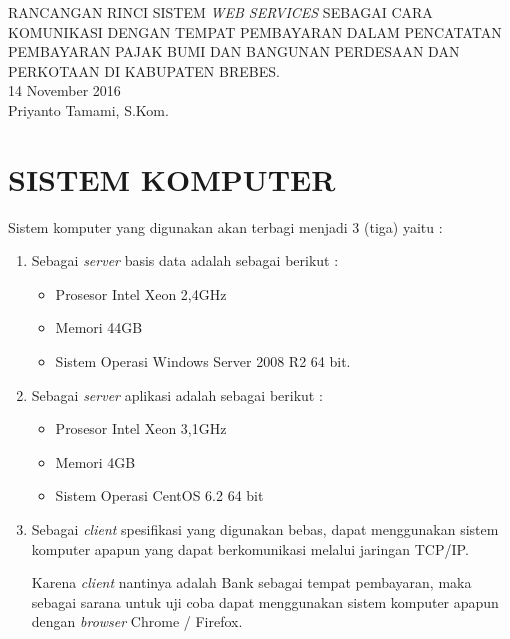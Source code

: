 \documentclass[pdftex,12pt, oneside]{article}
\begin{document}
\sloppy %

\begin{center}
{\large RANCANGAN RINCI SISTEM \textit{WEB SERVICES} SEBAGAI CARA KOMUNIKASI DENGAN TEMPAT PEMBAYARAN DALAM PENCATATAN PEMBAYARAN PAJAK BUMI DAN BANGUNAN PERDESAAN DAN PERKOTAAN DI KABUPATEN BREBES.}
\\[1cm]
14 November 2016\\
Priyanto Tamami, S.Kom.
\end{center}




\section{SISTEM KOMPUTER}

Sistem komputer yang digunakan akan terbagi menjadi 3 (tiga) yaitu :

\begin{enumerate}[1.]
  \item Sebagai \textit{server} basis data adalah sebagai berikut :

    \begin{itemize}
      \item Prosesor Intel Xeon 2,4GHz
      \item Memori 44GB
      \item Sistem Operasi Windows Server 2008 R2 64 bit.
    \end{itemize}
    
  \item Sebagai \textit{server} aplikasi adalah sebagai berikut :
  
    \begin{itemize}
      \item Prosesor Intel Xeon 3,1GHz
      \item Memori 4GB
      \item Sistem Operasi CentOS 6.2 64 bit
    \end{itemize}
    
  \item Sebagai \textit{client} spesifikasi yang digunakan bebas, dapat menggunakan sistem komputer apapun yang dapat berkomunikasi melalui jaringan TCP/IP.
  
  Karena \textit{client} nantinya adalah Bank sebagai tempat pembayaran, maka sebagai sarana untuk uji coba dapat menggunakan sistem komputer apapun dengan \textit{browser} Chrome / Firefox.

\end{enumerate}
\end{document}
